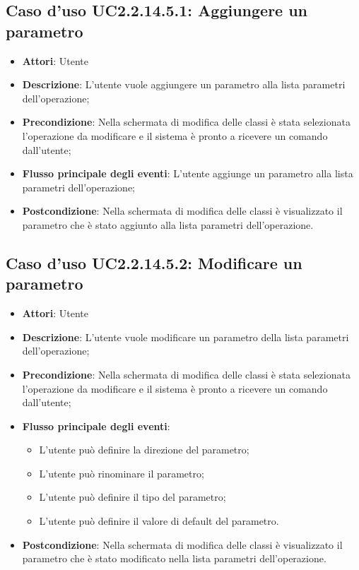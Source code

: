\documentclass[../AnalisiDeiRequisiti.tex]{subfiles}
\begin{document}
			\subsection{Caso d'uso UC2.2.14.5.1: Aggiungere un parametro}
			\begin{itemize}
				\item \textbf{Attori}: Utente
				\item \textbf{Descrizione}: L'utente vuole aggiungere un parametro alla lista parametri dell'operazione;
				\item \textbf{Precondizione}: Nella schermata di modifica delle classi è stata selezionata l'operazione da modificare e il sistema è pronto a ricevere un comando dall'utente;
				\item \textbf{Flusso principale degli eventi}: L'utente aggiunge un parametro alla lista parametri dell'operazione;
				\item \textbf{Postcondizione}: Nella schermata di modifica delle classi è visualizzato il parametro che è stato aggiunto alla lista parametri dell'operazione.
			\end{itemize}
			\subsection{Caso d'uso UC2.2.14.5.2: Modificare un parametro}
			\begin{itemize}
				\item \textbf{Attori}: Utente
				\item \textbf{Descrizione}: L'utente vuole modificare un parametro della lista parametri dell'operazione;
				\item \textbf{Precondizione}: Nella schermata di modifica delle classi è stata selezionata l'operazione da modificare e il sistema è pronto a ricevere un comando dall'utente;
				\item \textbf{Flusso principale degli eventi}: \begin{itemize} \item L'utente può definire la direzione del parametro; \item L'utente può rinominare il parametro; \item L'utente può definire il tipo del parametro; \item L'utente può definire il valore di default del parametro. \end{itemize}
				\item \textbf{Postcondizione}: Nella schermata di modifica delle classi è visualizzato il parametro che è stato modificato nella lista parametri dell'operazione.
			\end{itemize}
\end{document}
